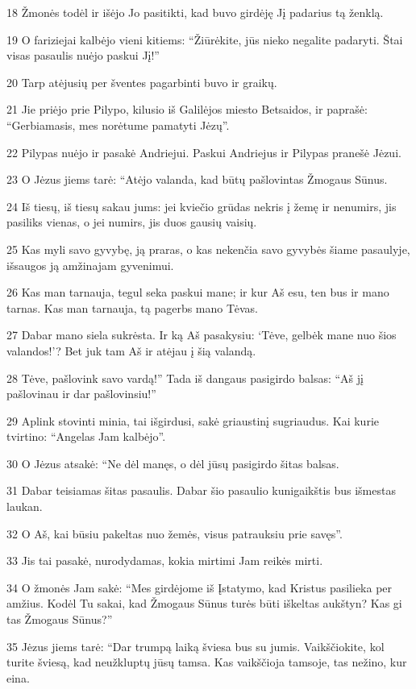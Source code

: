 \par 18 Žmonės todėl ir išėjo Jo pasitikti, kad buvo girdėję Jį padarius tą ženklą. 
\par 19 O fariziejai kalbėjo vieni kitiems: “Žiūrėkite, jūs nieko negalite padaryti. Štai visas pasaulis nuėjo paskui Jį!” 
\par 20 Tarp atėjusių per šventes pagarbinti buvo ir graikų. 
\par 21 Jie priėjo prie Pilypo, kilusio iš Galilėjos miesto Betsaidos, ir paprašė: “Gerbiamasis, mes norėtume pamatyti Jėzų”. 
\par 22 Pilypas nuėjo ir pasakė Andriejui. Paskui Andriejus ir Pilypas pranešė Jėzui. 
\par 23 O Jėzus jiems tarė: “Atėjo valanda, kad būtų pašlovintas Žmogaus Sūnus. 
\par 24 Iš tiesų, iš tiesų sakau jums: jei kviečio grūdas nekris į žemę ir nenumirs, jis pasiliks vienas, o jei numirs, jis duos gausių vaisių. 
\par 25 Kas myli savo gyvybę, ją praras, o kas nekenčia savo gyvybės šiame pasaulyje, išsaugos ją amžinajam gyvenimui. 
\par 26 Kas man tarnauja, tegul seka paskui mane; ir kur Aš esu, ten bus ir mano tarnas. Kas man tarnauja, tą pagerbs mano Tėvas. 
\par 27 Dabar mano siela sukrėsta. Ir ką Aš pasakysiu: ‘Tėve, gelbėk mane nuo šios valandos!’? Bet juk tam Aš ir atėjau į šią valandą. 
\par 28 Tėve, pašlovink savo vardą!” Tada iš dangaus pasigirdo balsas: “Aš jį pašlovinau ir dar pašlovinsiu!” 
\par 29 Aplink stovinti minia, tai išgirdusi, sakė griaustinį sugriaudus. Kai kurie tvirtino: “Angelas Jam kalbėjo”. 
\par 30 O Jėzus atsakė: “Ne dėl manęs, o dėl jūsų pasigirdo šitas balsas. 
\par 31 Dabar teisiamas šitas pasaulis. Dabar šio pasaulio kunigaikštis bus išmestas laukan. 
\par 32 O Aš, kai būsiu pakeltas nuo žemės, visus patrauksiu prie savęs”. 
\par 33 Jis tai pasakė, nurodydamas, kokia mirtimi Jam reikės mirti. 
\par 34 O žmonės Jam sakė: “Mes girdėjome iš Įstatymo, kad Kristus pasilieka per amžius. Kodėl Tu sakai, kad Žmogaus Sūnus turės būti iškeltas aukštyn? Kas gi tas Žmogaus Sūnus?” 
\par 35 Jėzus jiems tarė: “Dar trumpą laiką šviesa bus su jumis. Vaikščiokite, kol turite šviesą, kad neužkluptų jūsų tamsa. Kas vaikščioja tamsoje, tas nežino, kur eina. 
